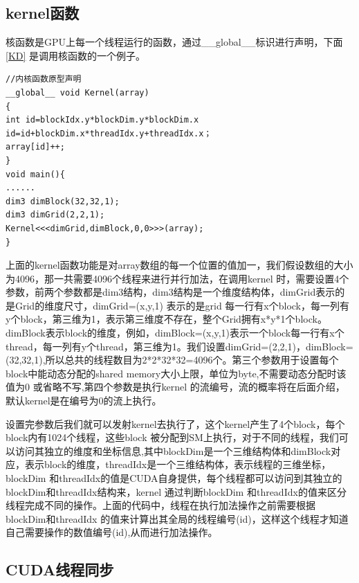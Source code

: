 \subsection{kernel函数}
核函数是GPU上每一个线程运行的函数，通过\_\_global\_\_标识进行声明，下面 \ref{KD} 是调用核函数的一个例子。
\begin{lstlisting}[caption={kernel调用代码示例},captionpos=b,firstnumber=1,label={KD}]
//内核函数原型声明
__global__ void Kernel(array)
{
int id=blockIdx.y*blockDim.y*blockDim.x
id=id+blockDim.x*threadIdx.y+threadIdx.x；
array[id]++;
}
void main(){
......
dim3 dimBlock(32,32,1);
dim3 dimGrid(2,2,1);
Kernel<<<dimGrid,dimBlock,0,0>>>(array);
}
\end{lstlisting}
上面的kernel函数功能是对array数组的每一个位置的值加一，我们假设数组的大小为4096，那一共需要4096个线程来进行并行加法，在调用kernel 时，需要设置4个参数，前两个参数都是dim3结构，dim3结构是一个维度结构体，dimGrid表示的是Grid的维度尺寸，dimGrid=(x,y,1) 表示的是grid 每一行有x个block，每一列有y个block，第三维为1，表示第三维度不存在，整个Grid拥有x*y*1个block。dimBlock表示block的维度，例如，dimBlock=(x,y,1)表示一个block每一行有x个thread，每一列有y个thread，第三维为1。我们设置dimGrid=(2,2,1)，dimBlock=(32,32,1),所以总共的线程数目为2*2*32*32=4096个。第三个参数用于设置每个block中能动态分配的shared memory大小上限，单位为byte,不需要动态分配时该值为0 或省略不写,第四个参数是执行kernel 的流编号，流的概率将在后面介绍，默认kernel是在编号为0的流上执行。

设置完参数后我们就可以发射kernel去执行了，这个kernel产生了4个block，每个block内有1024个线程，这些block 被分配到SM上执行，对于不同的线程，我们可以访问其独立的维度和坐标信息,其中blockDim是一个三维结构体和dimBlock对应，表示block的维度，threadIdx是一个三维结构体，表示线程的三维坐标，blockDim 和threadIdx的值是CUDA自身提供，每个线程都可以访问到其独立的blockDim和threadIdx结构来，kernel 通过判断blockDim 和threadIdx的值来区分线程完成不同的操作。上面的代码中，线程在执行加法操作之前需要根据blockDim和threadIdx 的值来计算出其全局的线程编号(id)，这样这个线程才知道自己需要操作的数值编号(id),从而进行加法操作。

\subsection{CUDA线程同步}

